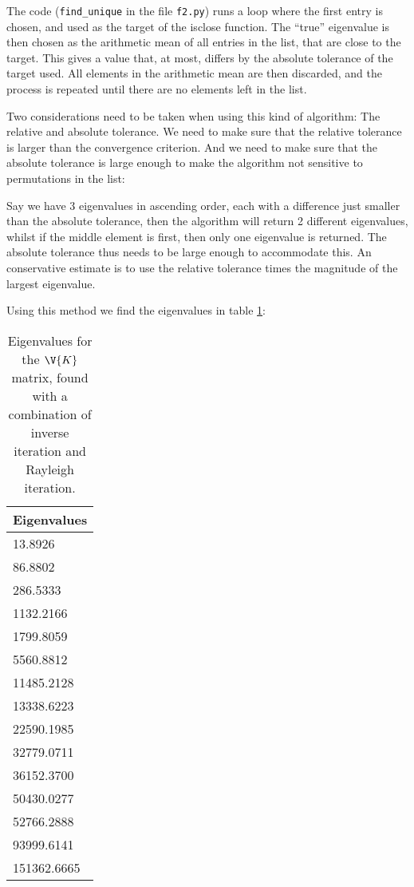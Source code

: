 \documentclass[a4paper,10pt]{article}
\begin{document}
	The code (\texttt{find\_unique} in the file \texttt{f2.py}) runs a loop where the first entry is chosen, and used as the target of the isclose function. The ``true'' eigenvalue is then chosen as the arithmetic mean of all entries in the list, that are close to the target. This gives a value that, at most, differs by the absolute tolerance of the target used. All elements in the arithmetic mean are then discarded, and the process is repeated until there are no elements left in the list.
	
	Two considerations need to be taken when using this kind of algorithm: The relative and absolute tolerance. We need to make sure that the relative tolerance is larger than the convergence criterion. And we need to make sure that the absolute tolerance is large enough to make the algorithm not sensitive to permutations in the list:
	
	Say we have 3 eigenvalues in ascending order, each with a difference just smaller than the absolute tolerance, then the algorithm will return 2 different eigenvalues, whilst if the middle element is first, then only one eigenvalue is returned. The absolute tolerance thus needs to be large enough to accommodate this. An conservative estimate is to use the relative tolerance times the magnitude of the largest eigenvalue.
	
	Using this method we find the eigenvalues in table \ref{tab:K_eigs}:
	
	\begin{table}[H]
		\centering
		\begin{tabular}{l}
			Eigenvalues \\
			\hline
			13.8926     \\
			86.8802     \\
			286.5333    \\
			1132.2166   \\
			1799.8059   \\
			5560.8812   \\
			11485.2128  \\
			13338.6223  \\
			22590.1985  \\
			32779.0711  \\
			36152.3700  \\
			50430.0277  \\
			52766.2888  \\
			93999.6141  \\
			151362.6665
		\end{tabular}
		\caption{Eigenvalues for the $ \V{K} $ matrix, found with a combination of inverse iteration and Rayleigh iteration.}
		\label{tab:K_eigs}
	\end{table}
	
\end{document}
